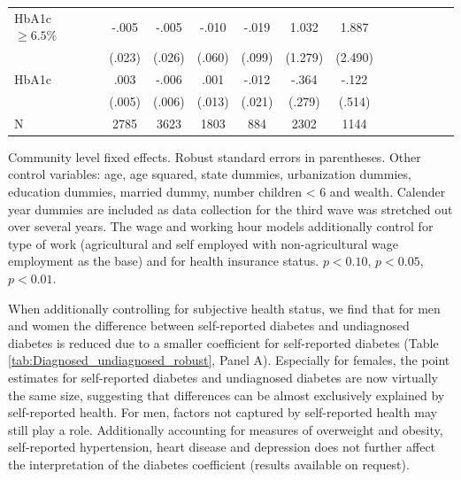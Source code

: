 \begin{table}[h!]
\begin{center}
\begin{adjustbox}{max width=\linewidth}
\begin{threeparttable}
{\begin{tabular}{l*{6}{S
S}}
HbA1c $\geq 6.5\%$&    -.005         &    -.005         &    -.010         &    -.019         &    1.032         &    1.887         \\
                &   (.023)         &   (.026)         &   (.060)         &   (.099)         &  (1.279)         &  (2.490)         \\
\addlinespace
HbA1c&     .003         &    -.006         &     .001         &    -.012         &    -.364         &    -.122         \\
                &   (.005)         &   (.006)         &   (.013)         &   (.021)         &   (.279)         &   (.514)         \\
\midrule
N               &     2785         &     3623         &     1803         &      884         &     2302         &     1144         \\
\bottomrule
\end{tabular}
\begin{tablenotes}
\item Community level fixed effects. Robust standard errors in parentheses. Other control variables: age, age squared, state dummies, urbanization dummies, education dummies, married dummy, number children < 6 and wealth. Calender year dummies are included as data collection for the third wave was stretched out over several years. The wage and working hour models additionally control for type of work (agricultural and self employed with non-agricultural wage employment as the base) and for health insurance status. \sym{*} \(p<0.10\), \sym{**} \(p<0.05\), \sym{***} \(p<0.01\).
\end{tablenotes}
}
\end{threeparttable}
\end{adjustbox}
\end{center}
\end{table}


When additionally controlling for subjective health status, we find that for men and women the difference between self-reported diabetes and undiagnosed diabetes is reduced due to a smaller coefficient for self-reported diabetes (Table \ref{tab:Diagnosed_undiagnosed_robust}, Panel A). Especially for females, the point estimates for self-reported diabetes and undiagnosed diabetes are now virtually the same size, suggesting that differences can be almost exclusively explained by self-reported health. For men, factors not captured by self-reported health may still play a role. Additionally accounting for measures of overweight and obesity, self-reported hypertension, heart disease and depression does not further affect the interpretation of the diabetes coefficient (results available on request).

